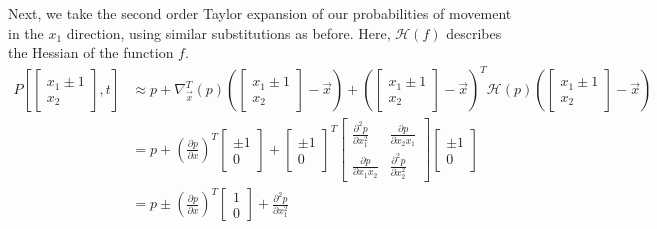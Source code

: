 Next, we take the second order Taylor expansion of our probabilities of movement in the $x_1$ direction, using similar substitutions as before. Here, $\mathcal{H}(f)$ describes the Hessian of the function $f$. 
\begin{align*}
    P\left[\begin{bmatrix} x_1\pm1\\x_2 \end{bmatrix}, t\right] &\approx p + \nabla^T_{\vec{x}}(p) \left(\begin{bmatrix} x_1\pm1\\x_2 \end{bmatrix} - \vec{x}\right) + \left(\begin{bmatrix} x_1\pm1\\x_2 \end{bmatrix} - \vec{x}\right)^T \mathcal{H}(p)  \left(\begin{bmatrix} x_1\pm1\\x_2 \end{bmatrix} - \vec{x}\right) \\
    &= p + \left(\frac{\partial p}{\partial x}\right)^T \begin{bmatrix} \pm1\\0 \end{bmatrix} + \begin{bmatrix} \pm1\\0 \end{bmatrix}^T \begin{bmatrix}
        \frac{\partial^2 p}{\partial x_1^2} & \frac{\partial p}{\partial x_2 x_1} \\
        \frac{\partial p}{\partial x_1 x_2} & \frac{\partial^2 p}{\partial x_2^2}
    \end{bmatrix} \begin{bmatrix} \pm1\\0 \end{bmatrix} \\
    &= p \pm \left(\frac{\partial p}{\partial x}\right)^T \begin{bmatrix} 1\\0 \end{bmatrix} + \frac{\partial^2 p}{\partial x_1^2}
\end{align*}

